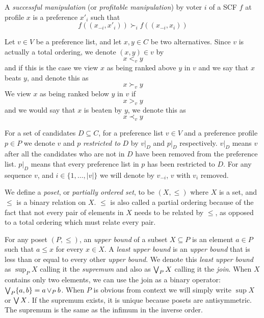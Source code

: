 	\begin{definition}
		A \emph{successful manipulation} (or \emph{profitable manipulation}) by voter $i$ of a SCF $f$ at profile $x$ is a preference $x'_i$ such that
		\[
			f((x_{-i}, x'_i)) \succ_i f((x_{-i}, x_i))
		\]
	\end{definition}

	\begin{definition}
		Let $v \in V$ be a preference list, and let $x, y \in C$ be two alternatives. Since $v$ is actually a total ordering, we denote $(x, y) \in v$ by
		\[
			x <_v y
		\]
		and if this is the case we view $x$ as being ranked above $y$ in $v$ and we say that $x$ beats $y$, and denote this as
		\[
			x \succ_v y
		\]
		We view $x$ as being ranked below $y$ in $v$ if
		\[
			x >_v y
		\]
		and we would say that $x$ is beaten by $y$, we denote this as
		\[
			x \prec_v y
		\]
	\end{definition}

	\begin{definition}
		For a set of candidates $D \subseteq C$, for a preference list $v \in V$ and a preference profile $p \in P$ we denote $v$ and $p$ \emph{restricted to} $D$ by $v|_D$ and $p|_D$ respectively. $v|_D$ means $v$ after all the candidates who are not in $D$ have been removed from the preference list. $p|_D$ means that every preference list in $p$ has been restricted to $D$. For any sequence $v$, and $i \in \{1, \ldots, |v|\}$ we will denote by $v_{-i}$, $v$ with $v_i$ removed.
	\end{definition}

	\begin{definition}
		We define a \emph{poset}, or \emph{partially ordered set}, to be $(X, \le)$ where $X$ is a set, and $\le$ is a binary relation on $X$. $\le$ is also called a partial ordering because of the fact that not every pair of elements in $X$ needs to be related by $\le$, as opposed to a total ordering which must relate every pair.
	\end{definition}

	\begin{definition}
		For any poset $(P, \le)$, an \emph{upper bound} of a subset $X \subseteq P$ is an element $a \in P$ such that $a \le x$ for every $x \in X$. A \emph{least upper bound} is an \emph{upper bound} that is less than or equal to every other \emph{upper bound}. We denote this \emph{least upper bound} as $\sup_P X$ calling it the \emph{supremum} \cite{birkhoﬀ1967lattice} and also as $\operatorname{\bigvee}_P X$ calling it the \emph{join}. When $X$ contains only two elements, we can use the join as a binary operator: $\operatorname{\bigvee}_P \{a, b\} = a \operatorname{\vee}_P b$. When $P$ is obvious from context we will simply write $\sup X$ or $\operatorname{\bigvee} X$. If the supremum exists, it is unique because posets are antisymmetric. The supremum is the same as the infimum in the inverse order.
	\end{definition}


